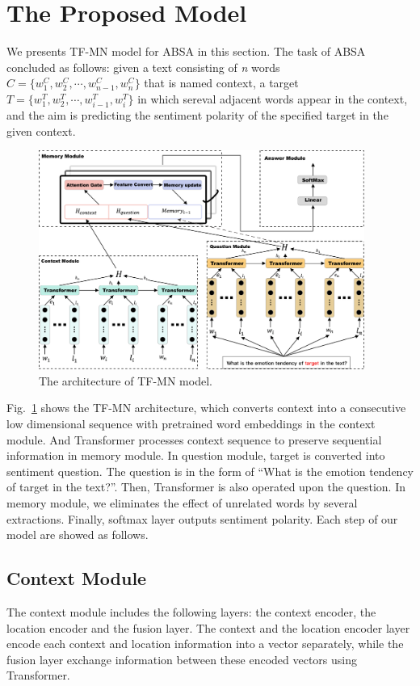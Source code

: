 \documentclass[runningheads, twocolumn]{llncs}
\begin{document}
\section{The Proposed Model}
We presents TF-MN model for ABSA in this section. The task of ABSA concluded as follows: given a text consisting of \emph{n} words $C = \{w_1^C, w_2^C, \cdots, w_{n-1}^C, w_n^C\}$ that is named context, a target $T = \{w_1^T, w_2^T, \cdots, w_{i-1}^T, w_i^T\}$ in which sereval adjacent words appear in the context, and the aim is predicting the sentiment polarity of the specified target in the given context.

\begin{figure}[htb]
	\includegraphics[width=0.95\textwidth]{Transformer-mn.png}
	\centering
	\caption{The architecture of TF-MN model.}\label{Transformer-mn}
\end{figure}

Fig.~\ref{Transformer-mn} shows the TF-MN architecture, which converts context into a consecutive low dimensional sequence with pretrained word embeddings in the context module. And Transformer processes context sequence to preserve sequential information in memory module. In question module, target is converted into sentiment question. The question is in the form of “What is the emotion tendency of target in the text?”. Then, Transformer is also operated upon the question. In memory module, we eliminates the effect of unrelated words by several extractions. Finally, softmax layer outputs sentiment polarity. Each step of our model are showed as follows.

\subsection{Context Module}
The context module includes the following layers: the context encoder, the location encoder and the fusion layer. The context and the location encoder layer encode each context and location information into a vector separately, while the fusion layer exchange information between these encoded vectors using Transformer.
\end{document}
